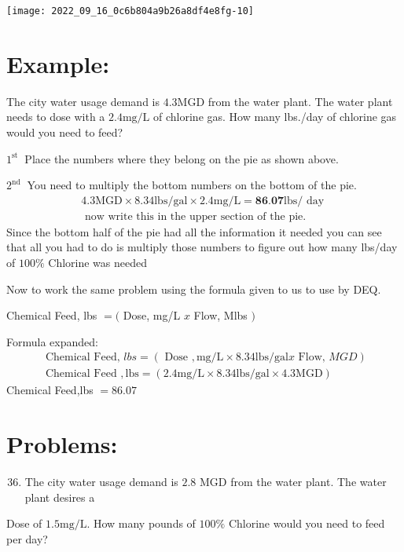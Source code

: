 \begin{enumerate}
\begin{enumerate}
\texttt{[image: 2022\_09\_16\_0c6b804a9b26a8df4e8fg-10]}

\end{enumerate}
\section{Example:}
The city water usage demand is $4.3 \mathrm{MGD}$ from the water plant. The water plant needs to dose with a $2.4 \mathrm{mg} / \mathrm{L}$ of chlorine gas. How many lbs./day of chlorine gas would you need to feed?

$1^{\text {st }}$ Place the numbers where they belong on the pie as shown above.

$2^{\text {nd }}$ You need to multiply the bottom numbers on the bottom of the pie.
$$
\begin{array}{r}
4.3 \mathrm{MGD} \times 8.34 \mathrm{lbs} / \mathrm{gal} \times 2.4 \mathrm{mg} / \mathrm{L}=\mathbf{8 6 . 0 7} \mathrm{lbs} / \text { day } \\
\text { now write this in the upper section of the pie. }
\end{array}
$$
Since the bottom half of the pie had all the information it needed you can see that all you had to do is multiply those numbers to figure out how many lbs/day of $100 \%$ Chlorine was needed

Now to work the same problem using the formula given to us to use by DEQ.

Chemical Feed, lbs $=($ Dose, mg/L $x$ Flow, Mlbs $)$

Formula expanded:
$$
\begin{gathered}
\text { Chemical Feed, } l b s=(\text { Dose }, \mathrm{mg} / \mathrm{L} \times 8.34 \mathrm{lbs} / \mathrm{gal} x \text { Flow, } M G D) \\
\text { Chemical Feed }, \mathrm{lbs}=(2.4 \mathrm{mg} / \mathrm{L} \times 8.34 \mathrm{lbs} / \mathrm{gal} \times 4.3 \mathrm{MGD})
\end{gathered}
$$
Chemical Feed,lbs $=86.07$

\section{Problems:}
\begin{enumerate}
  \setcounter{enumi}{35}
  \item The city water usage demand is $2.8$ MGD from the water plant. The water plant desires a
\end{enumerate}
Dose of $1.5 \mathrm{mg} / \mathrm{L}$. How many pounds of $100 \%$ Chlorine would you need to feed per day?


\end{enumerate}
